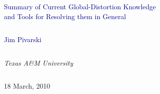 \documentclass[compress]{beamer}
\begin{document}
\begin{frame}
\vfill
\begin{center}
\textcolor{darkblue}{\Large Summary of Current Global-Distortion Knowledge \\ \vspace{0.2 cm} and Tools for Resolving them in General}

\vfill
\begin{columns}
\begin{center}
\large
\textcolor{darkblue}{Jim Pivarski}
\end{center}
\end{columns}

\begin{columns}
\begin{center}
\scriptsize
{\it Texas A\&M University}
\end{center}
\end{columns}

\vfill
18 March, 2010

\end{center}
\end{frame}


\small
\end{document}
